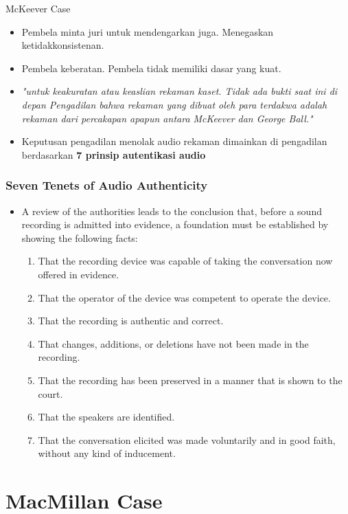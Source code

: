 \documentclass[pdflatex,compress]{beamer}
\begin{document}
\begin{frame}{McKeever Case}
	\begin{itemize}
		\item Pembela minta juri untuk mendengarkan juga. Menegaskan ketidakkonsistenan.
		\item Pembela keberatan. Pembela tidak memiliki dasar yang kuat.
		\item \textit{"untuk keakuratan atau keaslian rekaman kaset. Tidak ada bukti saat ini di depan Pengadilan bahwa rekaman yang dibuat oleh para terdakwa adalah rekaman dari percakapan apapun antara McKeever dan George Ball."}
		\item Keputusan pengadilan menolak audio rekaman dimainkan di pengadilan berdasarkan \textbf{7 prinsip autentikasi audio}
	\end{itemize}
\end{frame}

\begin{frame}
\frametitle{Seven Tenets of Audio Authenticity}
	\begin{itemize}
		\item 	A review of the authorities leads to the conclusion that, before a sound recording is admitted into evidence, a foundation must be established by showing the following facts:
		\begin{enumerate}
			\item That the recording device was capable of taking the conversation now offered in evidence.
			\item That the operator of the device was competent to operate the device.
			\item That the recording is authentic and correct.
			\item That changes, additions, or deletions have not been made in the recording.
			\item That the recording has been preserved in a manner that is shown to the court.
			\item That the speakers are identified.
			\item That the conversation elicited was made voluntarily and in good faith, without any kind of inducement.
		\end{enumerate}
	\end{itemize}
\end{frame}

\section{MacMillan Case}
\end{document}
